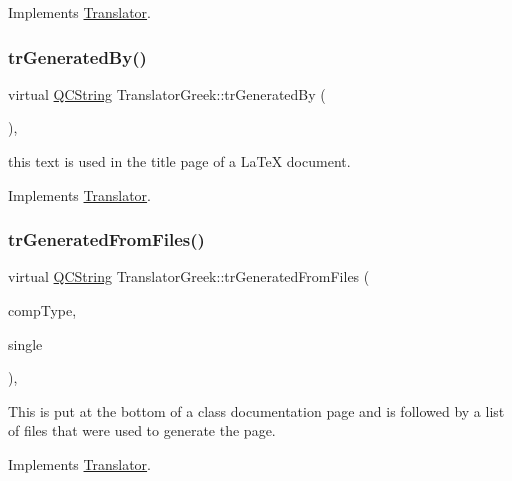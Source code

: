 Implements \mbox{\hyperlink{class_translator}{Translator}}.

\mbox{\label{class_translator_greek_a97490b40f9a93f24b17ba9f6957e33d5}} 
\subsubsection{\texorpdfstring{trGeneratedBy()}{trGeneratedBy()}}
{\footnotesize\ttfamily virtual \mbox{\hyperlink{class_q_c_string}{Q\+C\+String}} Translator\+Greek\+::tr\+Generated\+By (\begin{DoxyParamCaption}{ }\end{DoxyParamCaption})\hspace{0.3cm}{\ttfamily [inline]}, {\ttfamily [virtual]}}

this text is used in the title page of a La\+TeX document. 

Implements \mbox{\hyperlink{class_translator}{Translator}}.

\mbox{\label{class_translator_greek_ae5d424334b6cf190a6558e37b3f64e66}} 
\subsubsection{\texorpdfstring{trGeneratedFromFiles()}{trGeneratedFromFiles()}}
{\footnotesize\ttfamily virtual \mbox{\hyperlink{class_q_c_string}{Q\+C\+String}} Translator\+Greek\+::tr\+Generated\+From\+Files (\begin{DoxyParamCaption}\item[{\mbox{\hyperlink{class_class_def_ae70cf86d35fe954a94c566fbcfc87939}{Class\+Def\+::\+Compound\+Type}}}]{comp\+Type,  }\item[{bool}]{single }\end{DoxyParamCaption})\hspace{0.3cm}{\ttfamily [inline]}, {\ttfamily [virtual]}}

This is put at the bottom of a class documentation page and is followed by a list of files that were used to generate the page. 

Implements \mbox{\hyperlink{class_translator}{Translator}}.

